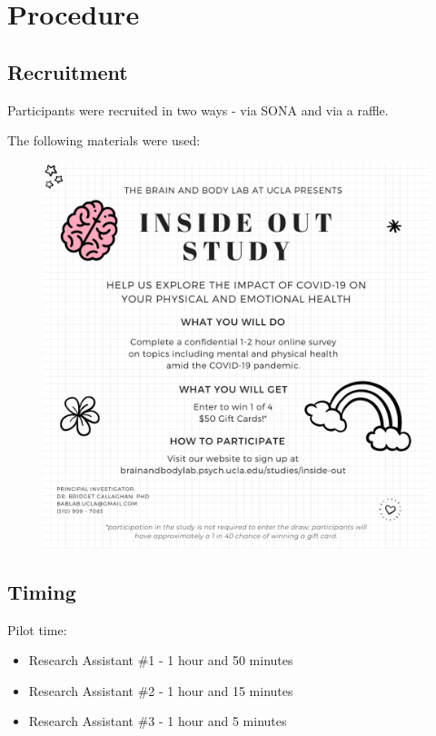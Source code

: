 \documentclass[]{book}
\providecommand{\tightlist}{%
  \setlength{\itemsep}{0pt}\setlength{\parskip}{0pt}}
\begin{document}
\hypertarget{procedure}{%
\section{Procedure}\label{procedure}}

\hypertarget{recruitment}{%
\subsection{Recruitment}\label{recruitment}}

Participants were recruited in two ways - via SONA and via a raffle.

The following materials were used:

\begin{figure}
\centering
\includegraphics{images/inside_out_instagram.png}
\caption{}
\end{figure}

\hypertarget{timing}{%
\subsection{Timing}\label{timing}}

Pilot time:

\begin{itemize}
\tightlist
\item
  Research Assistant \#1 - 1 hour and 50 minutes
\item
  Research Assistant \#2 - 1 hour and 15 minutes
\item
  Research Assistant \#3 - 1 hour and 5 minutes
\end{itemize}
\end{document}
